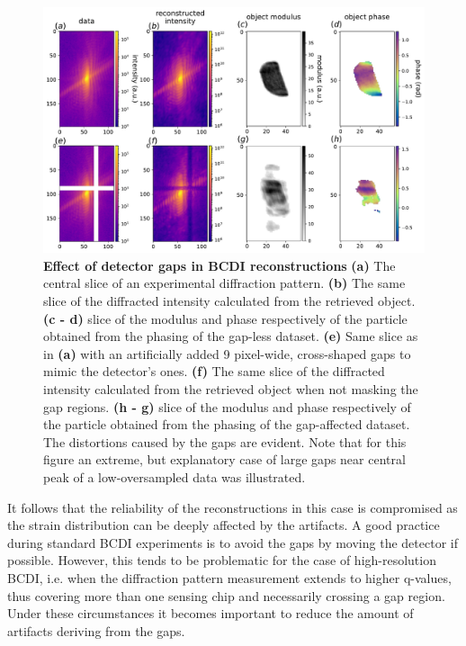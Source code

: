 \begin{figure}[h]
    \includegraphics[width=\textwidth]{figures/Inpainting/gaps_intropdf.pdf}
    \caption{\textbf{Effect of detector gaps in BCDI reconstructions} 
    \textbf{(a)} The central slice of an experimental diffraction pattern. \textbf{(b)} The same slice of the diffracted
    intensity calculated from the retrieved object. \textbf{(c - d)} slice of the modulus and phase respectively of the particle
    obtained from the phasing of the gap-less dataset. \textbf{(e)} Same slice as in \textbf{(a)} with an artificially added
    9 pixel-wide, cross-shaped gaps to mimic the detector's ones. \textbf{(f)} The same slice of the diffracted
    intensity calculated from the retrieved object when not masking the gap regions. \textbf{(h - g)} slice of the modulus and phase respectively of the particle
    obtained from the phasing of the gap-affected dataset. The distortions caused by the gaps are evident. Note that for 
    this figure an extreme, but explanatory case of large gaps near central peak of a low-oversampled data was illustrated. }
    \label{fig:gap_intro}
    \end{figure}


It follows that the reliability of the reconstructions in this case is 
compromised as the strain distribution can be deeply affected by the artifacts. A good practice during standard BCDI experiments
is to avoid the gaps by moving the detector if possible. However, this tends to be problematic for the case of high-resolution BCDI, 
i.e. when the diffraction pattern measurement extends to higher q-values, thus covering more than one sensing 
chip and necessarily crossing a gap region. Under these circumstances it becomes important to reduce the amount of
artifacts deriving from the gaps. 


